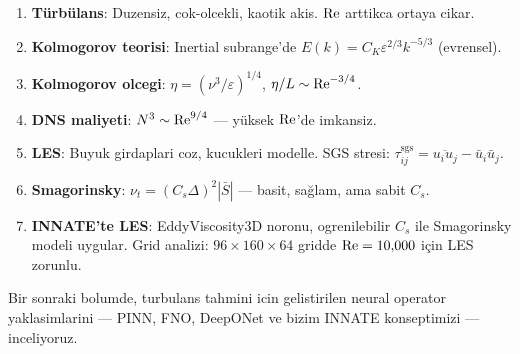 \begin{enumerate}
\item \textbf{Türbülans}: Duzensiz, cok-olcekli, kaotik akis. $\mathrm{Re}$ arttikca ortaya cikar.
\item \textbf{Kolmogorov teorisi}: Inertial subrange'de $E(k) = C_K\varepsilon^{2/3}k^{-5/3}$ (evrensel).
\item \textbf{Kolmogorov olcegi}: $\eta = (\nu^3/\varepsilon)^{1/4}$, $\eta/L \sim \mathrm{Re}^{-3/4}$.
\item \textbf{DNS maliyeti}: $N^3 \sim \mathrm{Re}^{9/4}$ --- yüksek $\mathrm{Re}$'de imkansiz.
\item \textbf{LES}: Buyuk girdaplari coz, kucukleri modelle. SGS stresi: $\tau_{ij}^{\text{sgs}} = \overline{u_iu_j} - \bar{u}_i\bar{u}_j$.
\item \textbf{Smagorinsky}: $\nu_t = (C_s\Delta)^2|\bar{S}|$ --- basit, sağlam, ama sabit $C_s$.
\item \textbf{INNATE'te LES}: EddyViscosity3D noronu, ogrenilebilir $C_s$ ile Smagorinsky modeli uygular. Grid analizi: $96\times160\times64$ gridde $\mathrm{Re} = 10{,}000$ için LES zorunlu.
\end{enumerate}

Bir sonraki bolumde, turbulans tahmini icin gelistirilen neural operator yaklasimlarini --- PINN, FNO, DeepONet ve bizim INNATE konseptimizi --- inceliyoruz.
